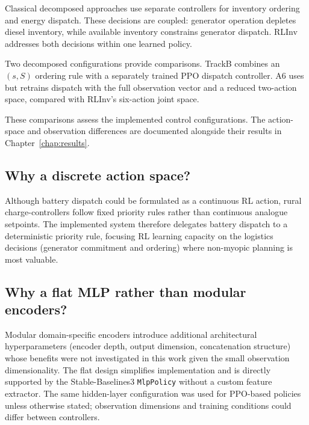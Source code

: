 Classical decomposed approaches use separate controllers
for inventory ordering and energy dispatch. These
decisions are coupled: generator operation depletes
diesel inventory, while available inventory constrains
generator dispatch. RLInv addresses both decisions
within one learned policy.

Two decomposed configurations provide comparisons.
TrackB combines an $(s,S)$ ordering rule with a
separately trained PPO dispatch controller. A6 uses
 but retrains dispatch with
the full observation vector and a reduced two-action
space, compared with RLInv's six-action joint space.

These comparisons assess the implemented control
configurations. The action-space and observation
differences are documented alongside their results
in Chapter~\ref{chap:results}.


\subsection{Why a discrete action space?}

Although battery dispatch could be formulated as a continuous RL action,
rural charge-controllers follow fixed priority rules rather than
continuous analogue setpoints. The implemented system therefore delegates
battery dispatch to a deterministic priority rule, focusing RL learning
capacity on the logistics decisions (generator commitment and ordering)
where non-myopic planning is most valuable.

\subsection{Why a flat MLP rather than modular encoders?}


 Modular domain-specific encoders introduce
additional architectural hyperparameters (encoder depth, output dimension,
concatenation structure) whose benefits were not investigated in this work
given the small observation dimensionality. The flat design simplifies
implementation and is directly supported by the Stable-Baselines3
\texttt{MlpPolicy} without a custom feature extractor. 
The same hidden-layer configuration was used
for PPO-based policies unless otherwise stated;
observation dimensions and training conditions
could differ between controllers.

